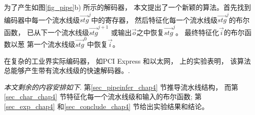 为了产生如图\ref{fig_pipe}b) 所示的解码器，
本文提出了一个新颖的算法。首先找到编码器中每一个流水线级$\vec{stg}^j$中的寄存器，
然后特征化每一个流水线级$\vec{stg}^j$的布尔函数，
已从下一个流水线级$\vec{stg}^{j+1}$ 或输出$\vec{o}$之中恢复$\vec{stg}^j$。
最终特征化$\vec{i}$的布尔函数以葱
第一个流水线级$\vec{stg}^0$中恢复$\vec{i}$。


在复杂的工业界实际编码器，
如PCI Express \cite{pcie21} 和以太网\cite{IEEE8023_S4}，
上的实验表明，
该算法总能够产生带有流水线级的快速解码器。.


\emph{本文剩余的内容安排如下}.
第\ref{sec_pipeinfer_chap4} 节推导流水线结构，
而第\ref{sec_char_chap4} 节特征化每一个流水线级和输入的布尔函数;
第\ref{sec_exp_chap4} 和\ref{sec_conclude_chap4} 节给出实验结果和结论。


